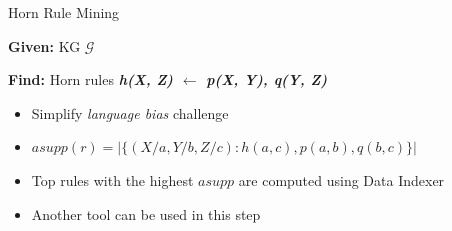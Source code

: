 \documentclass{beamer}
\def\cG{\ensuremath{\mathcal{G}}}
\begin{document}
\begin{frame}{Horn Rule Mining}

\textbf{Given:} KG $\cG$
\smallskip

\textbf{Find:} Horn rules \textit{\textbf{h(X, Z) $\leftarrow$ p(X, Y), q(Y, Z)}}
\smallskip
\begin{itemize}
	\item Simplify \textit{language bias} challenge
	\item $asupp(r)=|\{(X/a, Y/b, Z/c):h(a, c),p(a, b),q(b, c)\}|$
	\item Top rules with the highest $asupp$ are computed using Data Indexer
	\item Another tool can be used in this step
\end{itemize}

\end{frame}
\end{document}
